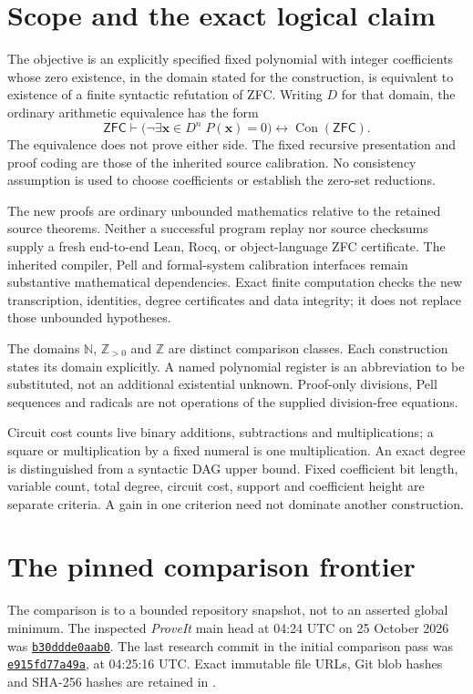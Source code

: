 \documentclass[11pt]{article}
\newcommand{\Z}{\mathbb Z}
\newcommand{\N}{\mathbb N}
\begin{document}
\section{Scope and the exact logical claim}
The objective is an explicitly specified fixed polynomial with integer
coefficients whose zero existence, in the domain stated for the construction,
is equivalent to existence of a finite syntactic refutation of ZFC.
Writing $D$ for that domain, the ordinary arithmetic equivalence has the form
\[
 \mathsf{ZFC}\vdash
 \bigl(\neg\exists\mathbf x\in D^n\;P(\mathbf x)=0\bigr)
 \longleftrightarrow\operatorname{Con}(\mathsf{ZFC}).
\]
The equivalence does not prove either side. The fixed recursive presentation
and proof coding are those of the inherited source calibration. No consistency
assumption is used to choose coefficients or establish the zero-set reductions.

The new proofs are ordinary unbounded mathematics relative to the retained
source theorems. Neither a successful program replay nor source checksums
supply a fresh end-to-end Lean, Rocq, or object-language ZFC certificate.
The inherited compiler, Pell and formal-system calibration interfaces remain
substantive mathematical dependencies. Exact finite computation checks the
new transcription, identities, degree certificates and data integrity; it does
not replace those unbounded hypotheses.

The domains $\N$, $\Z_{>0}$ and $\Z$ are distinct comparison classes.
Each construction states its domain explicitly. A named polynomial register
is an abbreviation to be substituted, not an additional existential unknown.
Proof-only divisions, Pell sequences and radicals are not operations of the
supplied division-free equations.

Circuit cost counts live binary additions, subtractions and multiplications;
a square or multiplication by a fixed numeral is one multiplication.
An exact degree is distinguished from a syntactic DAG upper bound. Fixed
coefficient bit length, variable count, total degree, circuit cost, support
and coefficient height are separate criteria. A gain in one criterion need
not dominate another construction.
\section{The pinned comparison frontier}
The comparison is to a bounded repository snapshot, not to an asserted global
minimum. The inspected \emph{ProveIt} main head at 04:24 UTC on 25 October 2026 was
\href{https://github.com/VladimirReshetnikov/ProveIt/commit/b30ddde0aab0ffc9687ec915234370ff916f052f}{\texttt{b30ddde0aab0}}.
The last research commit in the initial comparison pass was
\href{https://github.com/VladimirReshetnikov/ProveIt/commit/e915fd77a49a891d725afdf14844d825ece668b5}{\texttt{e915fd77a49a}},
at 04:25:16 UTC. Exact immutable file URLs, Git blob hashes and SHA-256
hashes are retained in .
\end{document}
